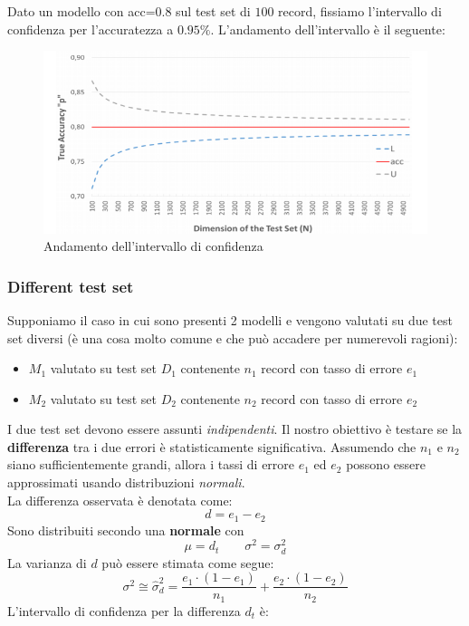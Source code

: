 Dato un modello con acc=0.8 sul test set di $100$ record, fissiamo l'intervallo di confidenza per l'accuratezza a $0.95\%$. L'andamento dell'intervallo è il seguente:

\begin{figure}[H]
	\centering
	\includegraphics[height=0.5 \linewidth]{classification/pict/inter_confidence.png}
	\caption{Andamento dell'intervallo di confidenza}
\end{figure}

\subsubsection{Different test set}
Supponiamo il caso in cui sono presenti 2 modelli e vengono valutati su due test set diversi (è una cosa molto comune e che può accadere per numerevoli ragioni):
\begin{itemize}
	\item $M_1$ valutato su test set $D_1$ contenente $n_1$ record con tasso di errore $e_1$
	\item $M_2$ valutato su test set $D_2$ contenente $n_2$ record con tasso di errore $e_2$
\end{itemize}
I due test set devono essere assunti \textit{indipendenti}. Il nostro obiettivo è testare se la \textbf{differenza} tra i due errori è statisticamente significativa.
Assumendo che $n_1$ e $n_2$ siano sufficientemente grandi, allora i tassi di errore $e_1$ ed $e_2$ possono essere approssimati usando distribuzioni \textit{normali}. \\
La differenza osservata è denotata come: 
\[d = e_1 - e_2\]
Sono distribuiti secondo una \textbf{normale} con 
\[\mu = d_t \qquad \sigma^2 = \sigma^2_d\] 
La varianza di $d$ può essere stimata come segue: 
\[\sigma^2 \cong \hat{\sigma}_d^2 = \frac{e_1 \cdot (1-e_1)}{n_1} + \frac{e_2 \cdot (1-e_2)}{n_2}\]
L'intervallo di confidenza per la differenza $d_t$ è: 

